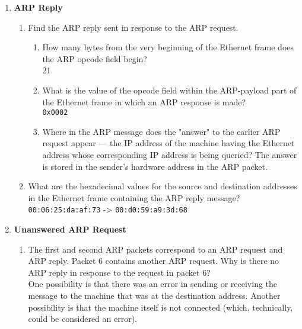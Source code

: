 \documentclass[12pt]{article}
\begin{document}
\begin{enumerate}[label=Q\arabic*:]
      \item \textbf{ARP Reply}
            \begin{enumerate}[label=(\alph*)]
                  \item Find the ARP reply sent in response to the ARP request.
                        \begin{enumerate}[label=(\roman*)]
                              \item How many bytes from the very beginning of the Ethernet frame does the ARP opcode field begin? \\
                                    21
                              \item What is the value of the opcode field within the ARP-payload part of the Ethernet frame in which an ARP response is made? \\
                                    \texttt{0x0002}
                              \item Where in the ARP message does the "answer" to the earlier ARP request appear — the IP address of the machine having the Ethernet address whose corresponding IP address is being queried?
                                    The answer is stored in the sender's hardware address in the ARP packet.
                        \end{enumerate}
                  \item What are the hexadecimal values for the source and destination addresses in the Ethernet frame containing the ARP reply message? \\
                        \texttt{00:06:25:da:af:73} -> \texttt{00:d0:59:a9:3d:68}
            \end{enumerate}

      \item \textbf{Unanswered ARP Request}
            \begin{enumerate}[label=(\alph*)]
                  \item The first and second ARP packets correspond to an ARP request and ARP reply. Packet 6 contains another ARP request. Why is there no ARP reply in response to the request in packet 6? \\
                        One possibility is that there was an error in sending or receiving the message to the machine that was at the destination address.
                        Another possibility is that the machine itself is not connected (which, technically, could be considered an error).
            \end{enumerate}


\end{enumerate}
\end{document}
